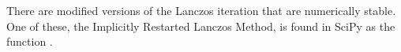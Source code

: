 There are modified versions of the Lanczos iteration that are numerically stable.
One of these, the Implicitly Restarted Lanczos Method, is found in SciPy as the function .

\begin{comment}
\begin{problem}
In Lab \ref{lab:MarkovGraph} we discussed how to find the Laplacian Matrix of a graph.
The second-smallest eigenvalue of a graph is known as the ``Fiedler Value" or the ``algebraic connectivity."
The algebraic connectivity of a graph is positive if the graph is connected and zero if it is not.
In general, the multiplicity of the eigenvalue $0$ in the Laplacian matrix of a graph is the number of connected components of that graph.
The following code constructs the Laplacian matrix of a graph composed of a line of nodes.
The matrix is stored in \li{dia_matrix} format.
\begin{lstlisting}
import scipy.sparse as ss
m = 1000
d = np.ones(m)
d[1:-1] += np.ones(m-2)
l = ss.diags([-np.ones(m-1), d, -np.ones(m-1)], [-1, 0, 1])
\end{lstlisting}
Use the \li{eigsh} function to verify that this graph is connected.
You should look at documentation for the \li{scipy.sparse} library and find the options you need to use.
For proper convergence you will want to leave the number of eigenvalues computed at its default value.

The following code constructs the Laplacian matrix the same graph as before except that a single edge has been removed.
\begin{lstlisting}
m = 1000
cut = 500
d = np.ones(m)
d[1:-1] += np.ones(m-2)
d1 = -np.ones(m-1)
d1[cut] = 0
d[[cut, cut+1]] =1
l = ss.diags([d1, d, d1], [-1, 0, 1])
\end{lstlisting}
Verify that this graph is not connected.
\end{problem}
\end{comment}
